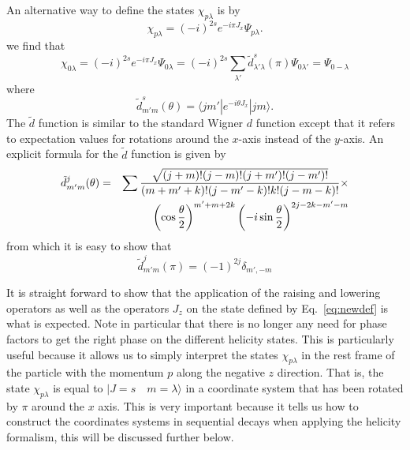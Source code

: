 An alternative way to define the states $\chi_{p\lambda}$ is by
\begin{equation}
\chi_{p\lambda}=(-i)^{2s}e^{-i\pi J_x}\Psi_{p\lambda}.
\label{eq:newdef}
\end{equation}
we find that
\begin{equation}
\chi_{0\lambda}=(-i)^{2s}e^{-i\pi J_x}\Psi_{0\lambda}=
(-i)^{2s}\sum_{\lambda'}\tilde d^s_{\lambda'\lambda}(\pi)\Psi_{0\lambda'}=\Psi_{0-\lambda}
\end{equation}
where
\begin{equation}
\tilde d^s_{m'm}(\theta)=\langle j m'|e^{-i\theta J_x}|j m\rangle.
\end{equation}
The $\tilde d$ function is similar to the standard Wigner $d$ function 
except that it refers to expectation values for rotations around the 
$x$-axis instead of the $y$-axis. An explicit formula for the 
$\tilde d$ function is given by
\begin{eqnarray}
\tilde d^j_{m'm}(\theta)& = & \nonumber
\sum {\sqrt{(j+m)!(j-m)!(j+m')!(j-m')!}\over (m+m'+k)!(j-m'-k)!k!(j-m-k)!}\times\\
& &\left(\cos{\theta\over 2}\right)^{m'+m+2k}
\left(-i\sin{\theta\over 2}\right)^{2j-2k-m'-m}
\end{eqnarray}
from which it is easy to show that
\begin{equation}
\tilde d^j_{m'm}(\pi)=(-1)^{2j}\delta_{m',-m}
\end{equation}

It is straight forward to show that the application of the raising and
lowering operators as well as the operators $J_z$ on the state defined
by Eq.~\ref{eq:newdef} is what is expected.
Note in particular that there is no longer any need for phase factors
to get the right phase on the different helicity states. This is
particularly useful because it allows us to simply interpret
the states $\chi_{p\lambda}$ in the rest frame of the particle with the
momentum $p$ along the negative $z$ direction. That is, the state
$\chi_{p\lambda}$ is equal to $|J=s\quad m=\lambda\rangle$ 
in a coordinate system that 
has been rotated by $\pi$ around the $x$ axis. This is very important
because it tells us how to construct the coordinates systems in
sequential decays when applying the helicity formalism, this will
be discussed further below.


